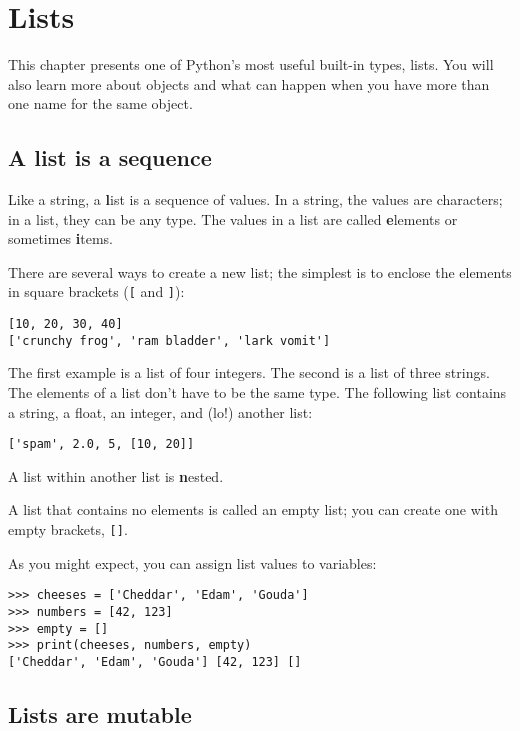 \documentclass[
DIV=11,
fontsize=12,
twoside,
headinclude=false,
titlepage=firstiscover,
abstract=true,
headsepline=true,
footsepline=true,
chapterprefix=true, %
headings=big,
bibliography=totoc,%
captions=tableheading
]{scrbook}
\theoremstyle{definition}
\begin{document}
\chapter{Lists}

This chapter presents one of Python's most useful built-in types, lists.
You will also learn more about objects and what can happen when you have
more than one name for the same object.


\section{A list is a sequence}
\label{sequence}

Like a string, a {\textbf list} is a sequence of values.  In a string, the
values are characters; in a list, they can be any type.  The values in
a list are called {\textbf elements} or sometimes {\textbf items}.

There are several ways to create a new list; the simplest is to
enclose the elements in square brackets (\verb"[" and \verb"]"):

\begin{lstlisting}
[10, 20, 30, 40]
['crunchy frog', 'ram bladder', 'lark vomit']
\end{lstlisting}
%
The first example is a list of four integers.  The second is a list of
three strings.  The elements of a list don't have to be the same type.
The following list contains a string, a float, an integer, and
(lo!) another list:

\begin{lstlisting}
['spam', 2.0, 5, [10, 20]]
\end{lstlisting}
%
A list within another list is {\textbf nested}.

A list that contains no elements is
called an empty list; you can create one with empty
brackets, \verb"[]".

As you might expect, you can assign list values to variables:

\begin{lstlisting}
>>> cheeses = ['Cheddar', 'Edam', 'Gouda']
>>> numbers = [42, 123]
>>> empty = []
>>> print(cheeses, numbers, empty)
['Cheddar', 'Edam', 'Gouda'] [42, 123] []
\end{lstlisting}
%


\section{Lists are mutable}
\label{mutable}
\end{document}

